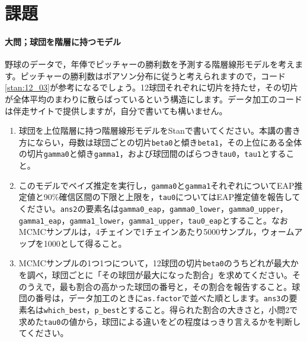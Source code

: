 \documentclass{ltjsbook}
\begin{document}
\section{課題}


\paragraph{大問；球団を階層に持つモデル}
野球のデータで，年俸でピッチャーの勝利数を予測する階層線形モデルを考えます。ピッチャーの勝利数はポアソン分布に従うと考えられますので，コード\ref{stan:12_03}が参考になるでしょう。12球団それぞれに切片を持たせ，その切片が全体平均のまわりに散らばっているという構造にします。データ加工のコードは伴走サイトで提供しますが，自分で書いても構いません。
\begin{enumerate}
	\item 球団を上位階層に持つ階層線形モデルをStanで書いてください。本講の書き方にならい，母数は球団ごとの切片\verb|beta0|と傾き\verb|beta1|，その上位にある全体の切片\verb|gamma0|と傾き\verb|gamma1|，および球団間のばらつき\verb|tau0|，\verb|tau1|とすること。
	\item このモデルでベイズ推定を実行し，\verb|gamma0|と\verb|gamma1|それぞれについてEAP推定値と90\%確信区間の下限と上限を，\verb|tau0|についてはEAP推定値を報告してください。\verb|ans2|の要素名は\verb|gamma0_eap|，\verb|gamma0_lower|，\verb|gamma0_upper|，\verb|gamma1_eap|，\verb|gamma1_lower|，\verb|gamma1_upper|，\verb|tau0_eap|とすること。なおMCMCサンプルは，4チェインで1チェインあたり5000サンプル，ウォームアップを1000として得ること。
	\item MCMCサンプルの1つ1つについて，12球団の切片\verb|beta0|のうちどれが最大かを調べ，球団ごとに「その球団が最大になった割合」を求めてください。そのうえで，最も割合の高かった球団の番号と，その割合を報告すること。球団の番号は，データ加工のときに\verb|as.factor|で並べた順とします。\verb|ans3|の要素名は\verb|which_best|，\verb|p_best|とすること。得られた割合の大きさと，小問2で求めた\verb|tau0|の値から，球団による違いをどの程度はっきり言えるかを判断してください。
\end{enumerate}
\end{document}
